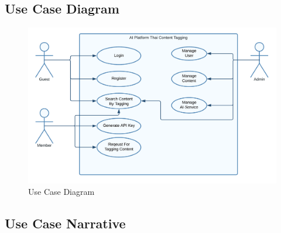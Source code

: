 \documentclass[12pt,oneside,openright,a4paper]{cpe-thai-project}
\begin{document}
\subsection{Use Case Diagram}
\begin{figure}[!ht]\centering
  \includegraphics[width=13cm]{./img/usecase.png}
  \caption{Use Case Diagram}\label{fig:usecase} 
\end{figure}

\subsection{Use Case Narrative}
\end{document}
